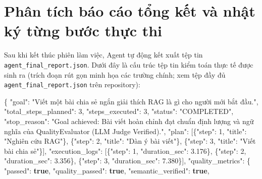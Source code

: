 \documentclass[]{article}
\newenvironment{Shaded}{}{}
\newcommand{\DataTypeTok}[1]{\textcolor[rgb]{0.56,0.13,0.00}{#1}}
\newcommand{\DecValTok}[1]{\textcolor[rgb]{0.25,0.63,0.44}{#1}}
\newcommand{\FloatTok}[1]{\textcolor[rgb]{0.25,0.63,0.44}{#1}}
\newcommand{\KeywordTok}[1]{\textcolor[rgb]{0.00,0.44,0.13}{\textbf{#1}}}
\newcommand{\NormalTok}[1]{#1}
\newcommand{\StringTok}[1]{\textcolor[rgb]{0.25,0.44,0.63}{#1}}
\begin{document}
\section{Phân tích báo cáo tổng kết và nhật ký từng bước thực thi}\label{phan-tich-bao-cao}

Sau khi kết thúc phiên làm việc, Agent tự động kết xuất tệp tin \texttt{agent\_final\_report.json}. Dưới đây là cấu trúc tệp tin kiểm toán thực tế được sinh ra (trích đoạn rút gọn minh họa các trường chính; xem tệp đầy đủ \texttt{agent\_final\_report.json} trên repository):

\begin{footnotesize}
\begin{Shaded}
\begin{Highlighting}[]
\NormalTok{\{}
\NormalTok{  }\DataTypeTok{"goal"}\NormalTok{: }\StringTok{"Viết một bài chia sẻ ngắn giải thích RAG là gì cho người mới bắt đầu."}\NormalTok{,}
\NormalTok{  }\DataTypeTok{"total_steps_planned"}\NormalTok{: }\DecValTok{3}\NormalTok{, }\DataTypeTok{"steps_executed"}\NormalTok{: }\DecValTok{3}\NormalTok{, }\DataTypeTok{"status"}\NormalTok{: }\StringTok{"COMPLETED"}\NormalTok{,}
\NormalTok{  }\DataTypeTok{"stop_reason"}\NormalTok{: }\StringTok{"Goal achieved: Bài viết hoàn chỉnh đạt chuẩn định lượng và ngữ nghĩa của QualityEvaluator (LLM Judge Verified)."}\NormalTok{,}
\NormalTok{  }\DataTypeTok{"plan"}\NormalTok{: [\{}\DataTypeTok{"step"}\NormalTok{: }\DecValTok{1}\NormalTok{, }\DataTypeTok{"title"}\NormalTok{: }\StringTok{"Nghiên cứu RAG"}\NormalTok{\}, \{}\DataTypeTok{"step"}\NormalTok{: }\DecValTok{2}\NormalTok{, }\DataTypeTok{"title"}\NormalTok{: }\StringTok{"Dàn ý bài viết"}\NormalTok{\}, \{}\DataTypeTok{"step"}\NormalTok{: }\DecValTok{3}\NormalTok{, }\DataTypeTok{"title"}\NormalTok{: }\StringTok{"Viết bài chia sẻ"}\NormalTok{\}],}
\NormalTok{  }\DataTypeTok{"execution_logs"}\NormalTok{: [\{}\DataTypeTok{"step"}\NormalTok{: }\DecValTok{1}\NormalTok{, }\DataTypeTok{"duration_sec"}\NormalTok{: }\FloatTok{3.176}\NormalTok{\}, \{}\DataTypeTok{"step"}\NormalTok{: }\DecValTok{2}\NormalTok{, }\DataTypeTok{"duration_sec"}\NormalTok{: }\FloatTok{3.356}\NormalTok{\}, \{}\DataTypeTok{"step"}\NormalTok{: }\DecValTok{3}\NormalTok{, }\DataTypeTok{"duration_sec"}\NormalTok{: }\FloatTok{7.380}\NormalTok{\}],}
\NormalTok{  }\DataTypeTok{"quality\_metrics"}\NormalTok{: \{}
\NormalTok{    }\DataTypeTok{"passed"}\NormalTok{: }\KeywordTok{true}\NormalTok{, }\DataTypeTok{"quality\_passed"}\NormalTok{: }\KeywordTok{true}\NormalTok{, }\DataTypeTok{"semantic\_verified"}\NormalTok{: }\KeywordTok{true}\NormalTok{,}

\end{Highlighting}
\end{Shaded}
\end{footnotesize}
\end{document}
